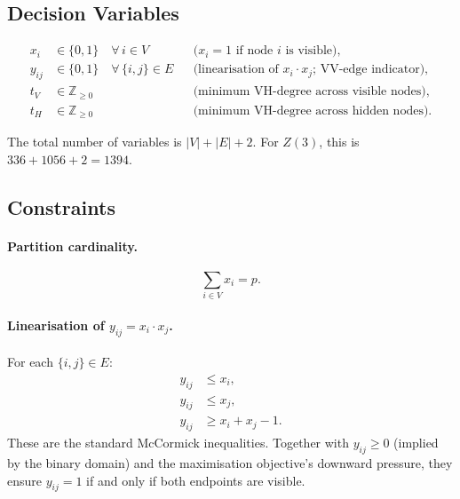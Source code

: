 \documentclass[11pt,a4paper]{article}
\begin{document}
\subsection{Decision Variables}

\begin{align}
  x_i &\in \{0,1\} \quad \forall\,i\in V  && \text{($x_i=1$ if node $i$ is visible),} \label{eq:xvar} \\
  y_{ij} &\in \{0,1\} \quad \forall\,\{i,j\}\in E && \text{(linearisation of $x_i \cdot x_j$; VV-edge indicator),} \label{eq:yvar} \\
  t_V &\in \mathbb{Z}_{\geq 0} && \text{(minimum VH-degree across visible nodes),} \label{eq:tvvar} \\
  t_H &\in \mathbb{Z}_{\geq 0} && \text{(minimum VH-degree across hidden nodes).} \label{eq:thvar}
\end{align}

The total number of variables is $|V| + |E| + 2$.  For $Z(3)$, this is $336 + 1056 + 2 = 1394$.

\subsection{Constraints}

\paragraph{Partition cardinality.}
\begin{equation}\label{eq:card}
  \sum_{i\in V} x_i = p.
\end{equation}

\paragraph{Linearisation of $y_{ij} = x_i \cdot x_j$.}  For each $\{i,j\}\in E$:
\begin{align}
  y_{ij} &\leq x_i, \label{eq:yub1}\\
  y_{ij} &\leq x_j, \label{eq:yub2}\\
  y_{ij} &\geq x_i + x_j - 1. \label{eq:ylb}
\end{align}
These are the standard McCormick inequalities.  Together with $y_{ij}\geq 0$ (implied by the binary domain) and the maximisation objective's downward pressure, they ensure $y_{ij}=1$ if and only if both endpoints are visible.
\end{document}
